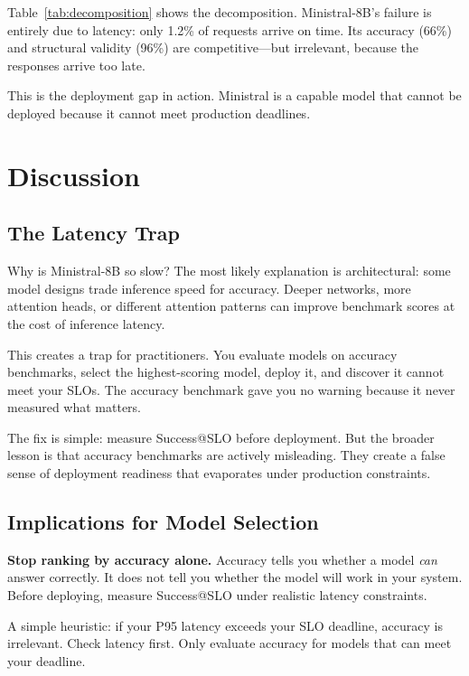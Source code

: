 \documentclass[11pt]{article}
\begin{document}
Table~\ref{tab:decomposition} shows the decomposition.
Ministral-8B's failure is entirely due to latency: only 1.2\% of requests arrive on time.
Its accuracy (66\%) and structural validity (96\%) are competitive---but irrelevant, because the responses arrive too late.

This is the deployment gap in action.
Ministral is a capable model that cannot be deployed because it cannot meet production deadlines.

\section{Discussion}
\label{sec:discussion}

\subsection{The Latency Trap}

Why is Ministral-8B so slow?
The most likely explanation is architectural: some model designs trade inference speed for accuracy.
Deeper networks, more attention heads, or different attention patterns can improve benchmark scores at the cost of inference latency.

This creates a trap for practitioners.
You evaluate models on accuracy benchmarks, select the highest-scoring model, deploy it, and discover it cannot meet your SLOs.
The accuracy benchmark gave you no warning because it never measured what matters.

The fix is simple: measure Success@SLO before deployment.
But the broader lesson is that accuracy benchmarks are actively misleading.
They create a false sense of deployment readiness that evaporates under production constraints.

\subsection{Implications for Model Selection}

\textbf{Stop ranking by accuracy alone.}
Accuracy tells you whether a model \emph{can} answer correctly.
It does not tell you whether the model will work in your system.
Before deploying, measure Success@SLO under realistic latency constraints.

A simple heuristic: if your P95 latency exceeds your SLO deadline, accuracy is irrelevant.
Check latency first.
Only evaluate accuracy for models that can meet your deadline.
\end{document}
